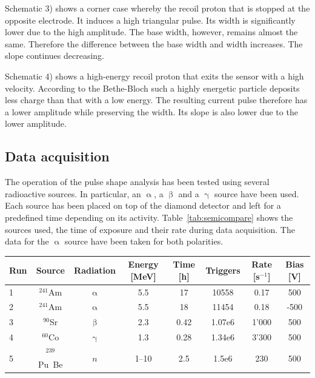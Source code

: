 Schematic 3) shows a corner case whereby the recoil proton that is stopped at the opposite electrode. It induces a high triangular pulse. Its width is significantly lower due to the high amplitude. The base width, however, remains almost the same. Therefore the difference between the base width and width increases. The slope continues decreasing.

Schematic 4) shows a high-energy recoil proton that exits the sensor with a high velocity. According to the Bethe-Bloch such a highly energetic particle deposits less charge than that with a low energy. The resulting current pulse therefore has a lower amplitude while preserving the width. Its slope is also lower due to the lower amplitude.


\subsection{Data acquisition}
The operation of the pulse shape analysis has been tested using several radioactive sources. In particular, an $\upalpha$, a $\upbeta$ and a $\upgamma$ source have been used. Each source has been placed on top of the diamond detector and left for a predefined time depending on its activity. Table~\ref{tab:semicompare} shows the sources used, the time of exposure and their rate during data acquisition. The data for the $\upalpha$ source have been taken for both polarities. 

\begin{footnotesize}
\begin{center}
\begin{tabular}{l c c c c c c c}
\hline
Run & Source & Radiation & Energy [MeV] & Time [h]  & Triggers & Rate [s$^{-1}$]  & Bias [V]   \\
\hline
1&$^{241}$Am  & $\upalpha$ & 5.5 & 17 & 10558 & 0.17  & 500 \\
2&$^{241}$Am  & $\upalpha$ & 5.5 & 18 & 11454 & 0.18 & -500 \\
3&$^{90}$Sr  & $\upbeta$ & 2.3 & 0.42 & 1.07e6 & 1'000 & 500 \\
4&$^{60}$Co  & $\upgamma$ & 1.3 & 0.28 & 1.34e6 & 3'300 & 500 \\
5&$^{239}$Pu~Be  & $n$ & 1--10 & 2.5 & 1.5e6 & 230 & 500 \\ 
\hline
\end{tabular}
\label{tab:sources}
\end{center}
\end{footnotesize}

